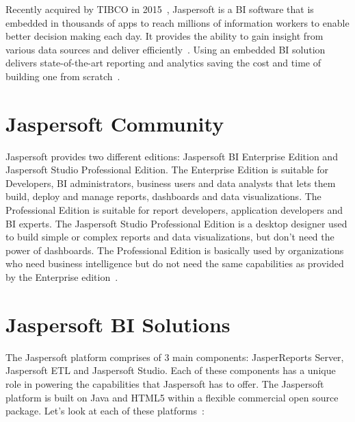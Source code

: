 Recently acquired by TIBCO in 2015~\cite{hid-sp18-516-www-wiki-jasperreports},
Jaspersoft is a BI software that is embedded in thousands of apps to reach
millions of information workers to enable better decision making each day. It
provides the ability to gain insight from various data sources and deliver
efficiently~\cite{hid-sp18-516-www-jaspersoft-overview}. Using an embedded BI
solution delivers state-of-the-art reporting and analytics saving the cost and
time of building one from scratch~\cite{hid-sp18-516-www-embedded-bi}. 


\section{Jaspersoft Community}
Jaspersoft provides two different editions: Jaspersoft BI Enterprise Edition and
Jaspersoft Studio Professional Edition. The Enterprise Edition is suitable for
Developers, BI administrators, business users and data analysts that lets them
build, deploy and manage reports, dashboards and data visualizations. The
Professional Edition is suitable for report developers, application developers
and BI experts. The Jaspersoft Studio Professional Edition is a desktop designer
used to build simple or complex reports and data visualizations, but don't need
the power of dashboards. The Professional Edition is basically used by
organizations who need business intelligence but do not need the same
capabilities as provided by the Enterprise
edition~\cite{hid-sp18-516-www-jaspersoft-download}.  


\section{Jaspersoft BI Solutions}
The Jaspersoft platform comprises of 3 main components: JasperReports Server,
Jaspersoft ETL and Jaspersoft Studio. Each of these components has a unique role
in powering the capabilities that Jaspersoft has to offer. The Jaspersoft
platform is built on Java and HTML5 within a flexible commercial open source
package. Let's look at each of these
platforms~\cite{hid-sp18-516-www-jaspersoft-quick-start}:

